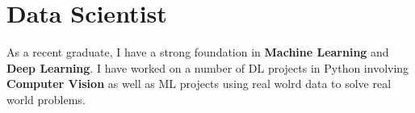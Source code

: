 
\section{Data Scientist}
\small{
    As a recent graduate, I have a strong foundation in \textbf{Machine Learning} and \textbf{Deep Learning}. I have  worked on a number of DL projects in Python involving \textbf{Computer Vision} as well as ML projects using real wolrd data to solve real world problems.
}